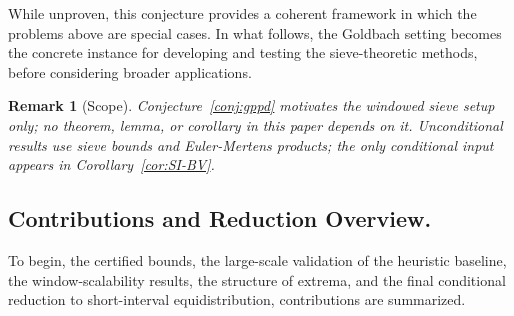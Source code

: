 \documentclass[11pt]{article}
\theoremstyle{inline}
\newtheorem*{remark}{Remark}
\theoremstyle{break}
\theoremstyle{break}
\theoremstyle{break}
\theoremstyle{break}
\theoremstyle{break}
\theoremstyle{break}
\theoremstyle{break}
\theoremstyle{inline}
\begin{document}
While unproven, this conjecture provides a coherent framework in which the problems above are special cases.  
In what follows, the Goldbach setting becomes the concrete instance for developing and testing the sieve-theoretic methods,  
before considering broader applications.

\begin{remark}[Scope]
Conjecture~\ref{conj:gppd} motivates the windowed sieve setup only; no theorem, lemma, or corollary in this paper depends on it. Unconditional results use sieve bounds and Euler-Mertens products; the only conditional input appears in Corollary~\ref{cor:SI-BV}.
\end{remark}


\subsection{Contributions and Reduction Overview.}
To begin, the certified bounds, the large-scale validation of the heuristic baseline, the window-scalability results, the structure of extrema, and the final conditional reduction to short-interval equidistribution, contributions are summarized.
\end{document}
